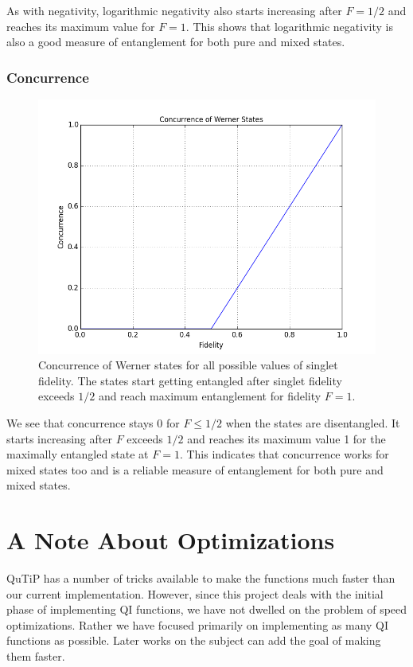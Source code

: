 As with negativity, logarithmic negativity also starts increasing after $F=1/2$ and reaches its maximum value for $F=1$. This shows that logarithmic negativity is also a good measure of entanglement for both pure and mixed states.


\subsubsection{Concurrence}

\begin{figure}[H]
  \begin{center}
    \includegraphics[scale=0.62]{figures/wernerstates-concurrence.png}
    \caption{Concurrence of Werner states for all possible values of singlet fidelity. The states start getting entangled after singlet fidelity exceeds $1/2$ and reach maximum entanglement for fidelity $F=1$.}
    \label{fig: Werner States: Concurrence}
  \end{center}
\end{figure}
We see that concurrence stays 0 for $F \leq 1/2$ when the states are disentangled. It starts increasing after $F$ exceeds $1/2$ and reaches its maximum value 1 for the maximally entangled state at $F=1$. This indicates that concurrence works for mixed states too and is a reliable measure of entanglement for both pure and mixed states.


\section{A Note About Optimizations}
QuTiP has a number of tricks available to make the functions much faster than our current implementation. However, since this project deals with the initial phase of implementing QI functions, we have not dwelled on the problem of speed optimizations. Rather we have focused primarily on implementing as many QI functions as possible. Later works on the subject can add the goal of making them faster.

